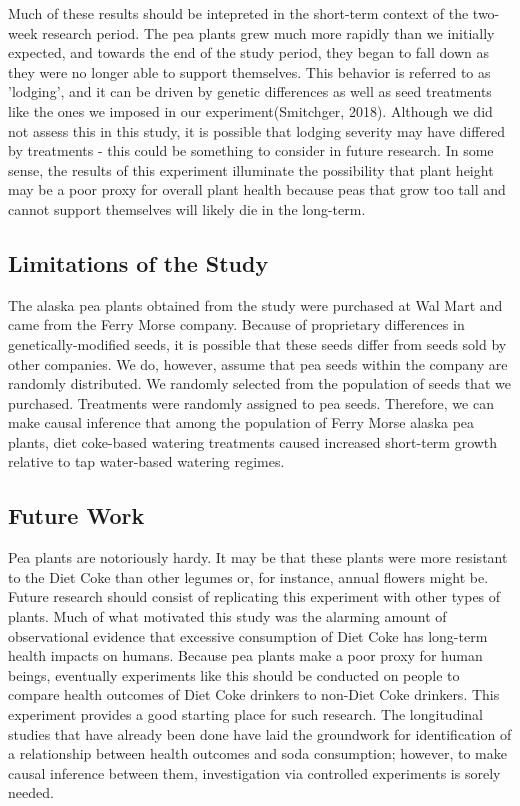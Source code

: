 \documentclass[1p,12pt]{elsarticle}\usepackage[]{graphicx}\usepackage[]{color}
\begin{document}
Much of these results should be intepreted in the short-term context of the two-week research period. The pea plants grew much more rapidly than we initially expected, and towards the end of the study period, they began to fall down as they were no longer able to support themselves. This behavior is referred to as 'lodging', and it can be driven by genetic differences as well as seed treatments like the ones we imposed in our experiment(Smitchger, 2018). Although we did not assess this in this study, it is possible that lodging severity may have differed by treatments - this could be something to consider in future research. In some sense, the results of this experiment illuminate the possibility that plant height may be a poor proxy for overall plant health because peas that grow too tall and cannot support themselves will likely die in the long-term. 

\subsection{Limitations of the Study}

The alaska pea plants obtained from the study were purchased at Wal Mart and came from the Ferry Morse company. Because of proprietary differences in genetically-modified seeds, it is possible that these seeds differ from seeds sold by other companies. We do, however, assume that pea seeds within the company are randomly distributed. We randomly selected from the population of seeds that we purchased.  Treatments were randomly assigned to pea seeds. Therefore, we can make causal inference that among the population of Ferry Morse alaska pea plants, diet coke-based watering treatments caused  increased short-term growth relative to tap water-based watering regimes. 



\subsection{Future Work}
Pea plants are notoriously hardy. It may be that these plants were more resistant to the Diet Coke than other legumes or, for instance, annual flowers might be. Future research should consist of replicating this experiment with other types of plants.  Much of what motivated this study was the alarming amount of observational evidence that excessive consumption of Diet Coke has long-term health impacts on humans. Because pea plants make a poor proxy for human beings, eventually experiments like this should be conducted on people to compare health outcomes of Diet Coke drinkers to non-Diet Coke drinkers. This experiment provides a good starting place for such research.  The longitudinal studies that have already been done have laid the groundwork for identification of a relationship between health outcomes and soda consumption; however, to make causal inference between them, investigation via controlled experiments is sorely needed. 
\end{document}
